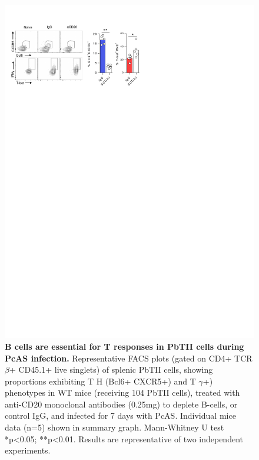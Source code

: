 \begin{figure}
    \centering
    \includegraphics[width=\textwidth]{"Fig S19 rev3"}
    \caption[B cells are essential for T responses in PbTII cells during PcAS infection]{\textbf{B cells are essential for T responses in PbTII cells during PcAS infection.} Representative FACS plots (gated on CD4+ TCR\( \beta \)+ CD45.1+ live singlets) of splenic PbTII cells, showing proportions exhibiting T H (Bcl6+ CXCR5+) and T \( \gamma \)+) phenotypes in WT mice (receiving 104 PbTII cells), treated with anti-CD20 monoclonal antibodies (0.25mg) to deplete B-cells, or control IgG, and infected for 7 days with PcAS. Individual mice data (n=5) shown in summary graph. Mann-Whitney U test *p<0.05; **p<0.01. Results are representative of two independent experiments.}
    \label{fig:ms19}
\end{figure}

